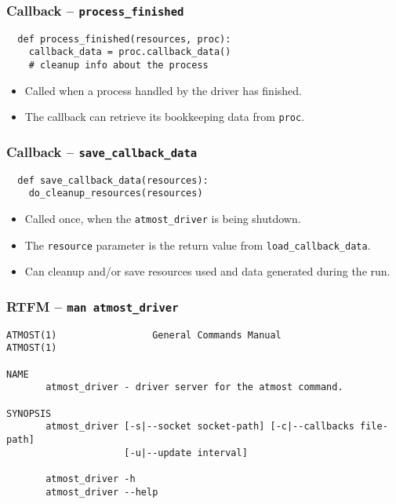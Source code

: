 \documentclass[compress,table,xcolor=table]{beamer}
\newcommand{\shelltext}[1]{\texttt{\colorbox{light-gray}{#1}}}
\begin{document}
\begin{frame}[fragile]
  \frametitle{Callback -- \shelltext{process\_finished}}
  \begin{lstlisting}
  def process_finished(resources, proc):
    callback_data = proc.callback_data()
    # cleanup info about the process
  \end{lstlisting}
  \begin{itemize}
    \Large
    \item Called when a process handled by the driver has finished.
    \item The callback can retrieve its bookkeeping data from \shelltext{proc}.
  \end{itemize}
\end{frame}
\begin{frame}[fragile]
  \frametitle{Callback -- \shelltext{save\_callback\_data}}
  \begin{lstlisting}
  def save_callback_data(resources):
    do_cleanup_resources(resources)
  \end{lstlisting}
  \begin{itemize}
    \Large
    \item Called once, when the \shelltext{atmost\_driver} is being shutdown.
    \item The \shelltext{resource} parameter is the return value from
      \shelltext{load\_callback\_data}.
    \item Can cleanup and/or save resources used and data generated during the run.
  \end{itemize}
\end{frame}
\begin{frame}[fragile]
  \frametitle{RTFM -- \shelltext{man atmost\_driver}}
\scriptsize
\begin{verbatim}
ATMOST(1)                 General Commands Manual                ATMOST(1)

NAME
       atmost_driver - driver server for the atmost command.

SYNOPSIS
       atmost_driver [-s|--socket socket-path] [-c|--callbacks file-path]
                     [-u|--update interval]

       atmost_driver -h
       atmost_driver --help
\end{verbatim}
\end{frame}
\end{document}
